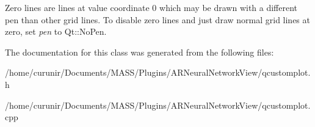 Zero lines are lines at value coordinate 0 which may be drawn with a different pen than other grid lines. To disable zero lines and just draw normal grid lines at zero, set {\itshape pen} to Qt\+::\+No\+Pen. 

The documentation for this class was generated from the following files\+:\begin{DoxyCompactItemize}
\item 
/home/curunir/\+Documents/\+M\+A\+S\+S/\+Plugins/\+A\+R\+Neural\+Network\+View/qcustomplot.\+h\item 
/home/curunir/\+Documents/\+M\+A\+S\+S/\+Plugins/\+A\+R\+Neural\+Network\+View/qcustomplot.\+cpp\end{DoxyCompactItemize}
